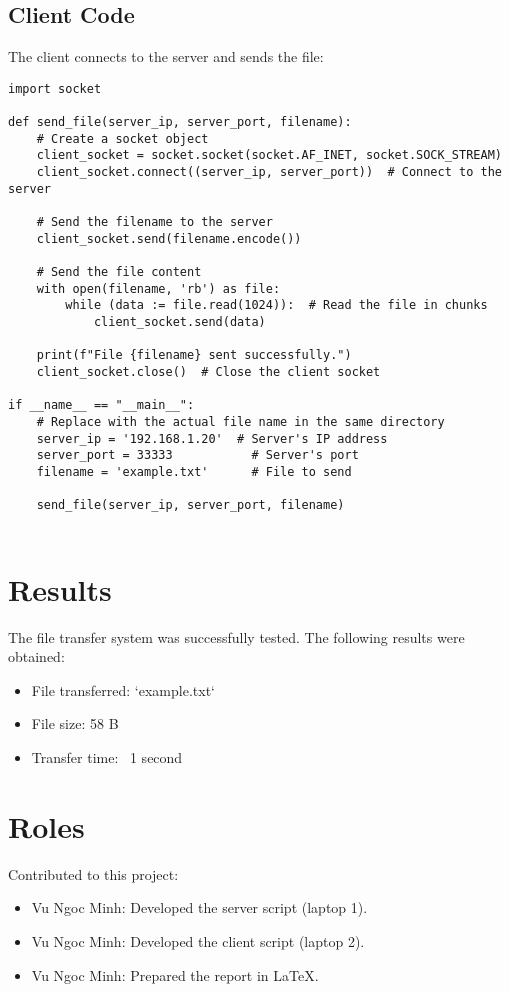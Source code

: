 \documentclass{article}
\begin{document}
\subsection{Client Code}
The client connects to the server and sends the file:
\begin{verbatim}
import socket

def send_file(server_ip, server_port, filename):
    # Create a socket object
    client_socket = socket.socket(socket.AF_INET, socket.SOCK_STREAM)
    client_socket.connect((server_ip, server_port))  # Connect to the server

    # Send the filename to the server
    client_socket.send(filename.encode())

    # Send the file content
    with open(filename, 'rb') as file:
        while (data := file.read(1024)):  # Read the file in chunks
            client_socket.send(data)

    print(f"File {filename} sent successfully.")
    client_socket.close()  # Close the client socket

if __name__ == "__main__":
    # Replace with the actual file name in the same directory
    server_ip = '192.168.1.20'  # Server's IP address
    server_port = 33333           # Server's port
    filename = 'example.txt'      # File to send

    send_file(server_ip, server_port, filename)


\end{verbatim}

\section{Results}
The file transfer system was successfully tested. The following results were obtained:
\begin{itemize}
    \item File transferred: `example.txt`
    \item File size: 58 B
    \item Transfer time: ~1 second
\end{itemize}

\section{Roles}
Contributed to this project:
\begin{itemize}
    \item Vu Ngoc Minh: Developed the server script (laptop 1).
    \item Vu Ngoc Minh: Developed the client script (laptop 2).
    \item Vu Ngoc Minh: Prepared the report in LaTeX.
\end{itemize}
\end{document}
